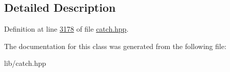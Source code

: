 \subsection{Detailed Description}


Definition at line \mbox{\hyperlink{catch_8hpp_source_l03178}{3178}} of file \mbox{\hyperlink{catch_8hpp_source}{catch.\+hpp}}.



The documentation for this class was generated from the following file\+:\begin{DoxyCompactItemize}
\item 
lib/catch.\+hpp\end{DoxyCompactItemize}
